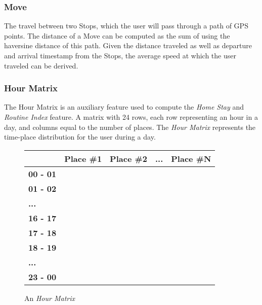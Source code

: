 \subsubsection*{Move}
The travel between two Stops, which the user will pass through a path of GPS points. The distance of a Move can be computed as the sum of using the haversine distance of this path. Given the distance traveled as well as departure and arrival timestamp from the Stops, the average speed at which the user traveled can be derived. 

\subsubsection*{Hour Matrix}
The Hour Matrix is an auxiliary feature used to compute the \textit{Home Stay} and \textit{Routine Index} feature. A matrix with 24 rows, each row representing an hour in a day, and columns equal to the number of places. The \textit{Hour Matrix} represents the time-place distribution for the user during a day.
\begin{figure}
    \centering
    \begin{tabular}{|l|l|l|l|l|}
    \hline
    \textbf{}        & \textbf{Place \#1} & \textbf{Place \#2} & \textbf{...} & \textbf{Place \#N} \\ \hline
    \textbf{00 - 01} &                    &                    &              &                    \\ \hline
    \textbf{01 - 02} &                    &                    &              &                    \\ \hline
    \textbf{...}     &                    &                    &              &                    \\ \hline
    \textbf{16 - 17} &                    &                    &              &                    \\ \hline
    \textbf{17 - 18} &                    &                    &              &                    \\ \hline
    \textbf{18 - 19} &                    &                    &              &                    \\ \hline
    \textbf{...}     &                    &                    &              &                    \\ \hline
    \textbf{23 - 00} &                    &                    &              &                    \\ \hline
    \end{tabular}
    \caption{An \textit{Hour Matrix}}
    \label{fig:time-table}
\end{figure}

